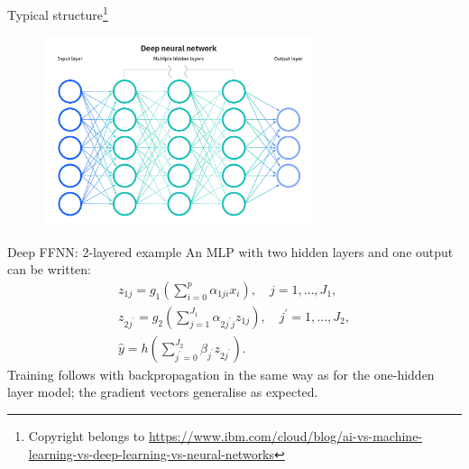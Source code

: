 \documentclass{beamer}
\begin{document}
\begin{frame}{Typical structure\footnote{Copyright belongs to \url{https://www.ibm.com/cloud/blog/ai-vs-machine-learning-vs-deep-learning-vs-neural-networks}}}
\begin{figure}
\includegraphics[width=0.7\textwidth]{Images/nn.jpg}
\end{figure}
\end{frame}
\begin{frame}{Deep FFNN: 2-layered example}
An MLP with two hidden layers and one output can be written:
$$
\begin{gathered}
z_{1 j}=g_1\left(\sum_{i=0}^{p} \alpha_{1 j i} x_{i}\right), \quad j=1, \ldots, J_{1}, \\
z_{2 j^{\prime}}=g_2\left(\sum_{j=1}^{J_{1}} \alpha_{2 j^{\prime} j} z_{1 j}\right), \quad j^{\prime}=1, \ldots, J_{2}, \\
\hat{y}=h\left(\sum_{j^{\prime}=0}^{J_{2}} \beta_{j^{\prime}} z_{2 j^{\prime}}\right).
\end{gathered}
$$
Training follows with backpropagation in the same way as for the one-hidden layer model; the gradient vectors generalise as expected.
\end{frame}
\end{document}
